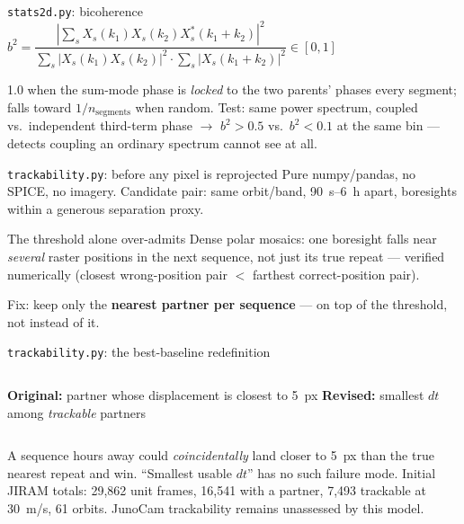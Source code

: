 \documentclass[aspectratio=169,11pt]{beamer}
\newcommand{\currevsec}{}
\newcommand{\revsec}[1]{\gdef\currevsec{#1}}
\begin{document}
\begin{frame}{\texttt{stats2d.py}: bicoherence}
  \revsec{4.14}
  $b^2 = \dfrac{|\sum_s X_s(k_1)X_s(k_2)X_s^*(k_1{+}k_2)|^2}{\sum_s|X_s(k_1)X_s(k_2)|^2 \cdot \sum_s|X_s(k_1{+}k_2)|^2} \in [0,1]$
  \vspace{0.2cm}

  1.0 when the sum-mode phase is \emph{locked} to the two parents' phases every segment; falls toward $1/n_{\text{segments}}$ when random.
  \vspace{0.2cm}
  Test: same power spectrum, coupled vs.\ independent third-term phase $\to$ $b^2 > 0.5$ vs.\ $b^2 < 0.1$ at the same bin --- detects coupling an ordinary spectrum cannot see at all.
\end{frame}

\begin{frame}{\texttt{trackability.py}: before any pixel is reprojected}
  \revsec{4.15}
  Pure numpy/pandas, no SPICE, no imagery. Candidate pair: same orbit/band, 90~s--6~h apart, boresights within a generous separation proxy.
  \begin{alertblock}{The threshold alone over-admits}
    Dense polar mosaics: one boresight falls near \emph{several} raster positions in the next sequence, not just its true repeat --- verified numerically (closest wrong-position pair $<$ farthest correct-position pair).
  \end{alertblock}
  Fix: keep only the \textbf{nearest partner per sequence} --- on top of the threshold, not instead of it.
\end{frame}

\begin{frame}{\texttt{trackability.py}: the best-baseline redefinition}
  \revsec{4.15}
  \begin{columns}
    \textbf{Original:} partner whose displacement is closest to 5~px
    \textbf{Revised:} smallest $dt$ among \emph{trackable} partners
  \end{columns}
  \vspace{0.3cm}
  A sequence hours away could \emph{coincidentally} land closer to 5~px than the true nearest repeat and win. ``Smallest usable $dt$'' has no such failure mode.
  \vspace{0.2cm}
  Initial JIRAM totals: 29{,}862 unit frames, 16{,}541 with a partner, 7{,}493 trackable at 30~m/s, 61 orbits. JunoCam trackability remains unassessed by this model.
\end{frame}
\end{document}
